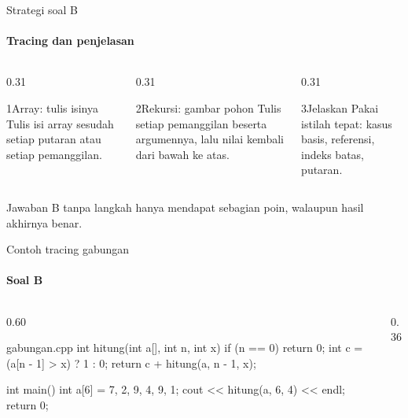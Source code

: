 \documentclass[t]{beamer}
\begin{document}
\begin{frame}{Strategi soal B}
\framesubtitle{Tracing dan penjelasan}
\begin{columns}[T]
\begin{column}{0.31\textwidth}
\begin{Langkah}{1}{Array: tulis isinya}
Tulis isi array sesudah setiap putaran atau setiap pemanggilan.
\end{Langkah}
\end{column}
\begin{column}{0.31\textwidth}
\begin{Langkah}{2}{Rekursi: gambar pohon}
Tulis setiap pemanggilan beserta argumennya, lalu nilai kembali dari bawah ke atas.
\end{Langkah}
\end{column}
\begin{column}{0.31\textwidth}
\begin{Langkah}{3}{Jelaskan}
Pakai istilah tepat: kasus basis, referensi, indeks batas, putaran.
\end{Langkah}
\end{column}
\end{columns}
\vspace{8pt}
Jawaban B tanpa langkah hanya mendapat sebagian poin, walaupun hasil akhirnya benar.
\end{frame}

\begin{frame}[fragile]{Contoh tracing gabungan}
\framesubtitle{Soal B}
\begin{columns}[T]
\begin{column}{0.60\textwidth}
\begin{Kode}[listing options={style=ITERACodeKecil}]{gabungan.cpp}
int hitung(int a[], int n, int x) {
    if (n == 0) return 0;
    int c = (a[n - 1] > x) ? 1 : 0;
    return c + hitung(a, n - 1, x);
}

int main() {
    int a[6] = {7, 2, 9, 4, 9, 1};
    cout << hitung(a, 6, 4) << endl;
    return 0;
}
\end{Kode}
\end{column}
\begin{column}{0.36\textwidth}
\end{column}
\end{columns}
\end{frame}
\end{document}
